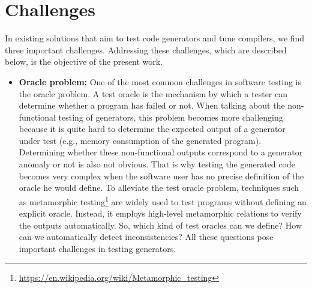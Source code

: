\section{Challenges}
In existing solutions that aim to test code generators and tune compilers, we find three important challenges. Addressing these challenges, which are described below, is the objective of the present work.
\begin{itemize}
\item
\textbf{Oracle problem:} One of the most common challenges in software testing is the oracle problem. A test oracle is the mechanism by which a tester can determine whether a program has failed or not.
When talking about the non-functional testing of generators, this problem becomes more challenging because it is quite hard to determine the expected output of a generator under test (e.g., memory consumption of the generated program). Determining whether these non-functional outputs correspond to a generator anomaly or not is also not obvious. That is why testing the generated code becomes very complex when the software user has no precise definition of the oracle he would define. 
To alleviate the test oracle problem, techniques such as metamorphic testing\footnote{\url{https://en.wikipedia.org/wiki/Metamorphic_testing}} are widely used to test programs without defining an explicit oracle. Instead, it employs high-level metamorphic relations to verify the outputs automatically.
So, which kind of test oracles can we define? How can we automatically detect inconsistencies? All these questions pose important challenges in testing generators.


\end{itemize}
